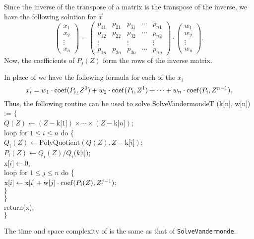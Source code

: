 Since the inverse of the transpose of a matrix is the transpose of the
inverse, we have the following solution for $\vec{x}$
\[
\left(
\begin{array}{c} x_1 \\ x_2 \\ \vdots \\ x_n \end{array}
\right) =
\left(
 \begin{array}{ccccc}
    p_{11}&p_{21}&p_{31}&\cdots&p_{n1}\\
    p_{12}&p_{22}&p_{32}&\cdots&p_{n2}\\
    \vdots& & \vdots& &\vdots\\
    p_{1n}&p_{2n}&p_{3n}&\cdots&p_{nn}
 \end{array}\right)
\cdot
\left(
\begin{array}{c} w_1 \\ w_2 \\ \vdots \\ w_n \end{array}
\right).
\]
Now, the coefficients of $P_j(Z)$ form the rows of the inverse matrix.

In place of  we have the following formula for
each of the $x_i$
\[
x_i = w_1 \cdot \mathop{\rm coef}\nolimits(P_i, Z^0) + w_2 \cdot \mathop{\rm coef}\nolimits(P_i, Z^1) +
\cdots + w_n \cdot \mathop{\rm coef}\nolimits(P_i ,Z^{n-1}).
\]
Thus, the following routine can be used to solve
\begindsacode
SolveVandermondeT (k[n], w[n]) := $\{$ \\
\> $Q(Z) \leftarrow   (Z - \mbox{k[$1$]})\times \cdots \times (Z - \mbox{k[$n$]})$; \\
\> loo\=p for \=$1 \le i \le n$ do \{ \\
\>\> $Q_i(Z) \leftarrow \mbox{PolyQuotient}(Q(Z), Z - \mbox{k[$i$]})$; \\
\>\> $P_i(Z) \leftarrow Q_i(Z)/Q_i(k[$i$])$; \\
\>\> $\mbox{x[$i$]} \leftarrow 0$; \\
\>\> loo\=p for $1 \le j \le n$ do \{ \\
\>\>\> $\mbox{x[$i$]} \leftarrow \mbox{x[$i$]} + \mbox{w[$j$]} \cdot
\mathop{\rm coef}\nolimits(P_i(Z), Z^{j-1})$;\\
\>\>\> $\}$ \\
\>\> $\}$ \\
\> return(x); \\
\> $\}$
\enddsacode

\noindent
The time and space complexity of  is the same as 
that of {\tt SolveVandermonde}. 

